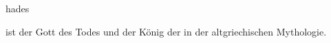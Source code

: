 \documentclass{stex}
\begin{document}
\begin{smodule}[sig=en]{hades}
\begin{sparagraph}[style=symdoc]
 ist der Gott des Todes und der König der
 in der altgriechischen Mythologie.
\end{sparagraph}
\end{smodule}
\end{document}
